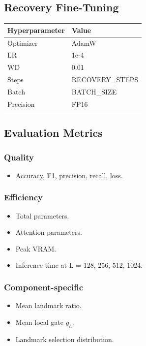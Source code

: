 \subsection{Recovery Fine-Tuning}

\begin{table}[H]
\centering
\small
\begin{tabular}{ll}
\toprule
\textbf{Hyperparameter} & \textbf{Value} \\
\midrule
Optimizer & AdamW \\
LR & 1e-4 \\
WD & 0.01 \\
Steps & {{RECOVERY\_STEPS}} \\
Batch & {{BATCH\_SIZE}} \\
Precision & FP16 \\
\bottomrule
\end{tabular}
\end{table}

\subsection{Evaluation Metrics}

\subsubsection{Quality}
\begin{itemize}
\item Accuracy, F1, precision, recall, loss.

\end{itemize}
\subsubsection{Efficiency}
\begin{itemize}
\item Total parameters.
\item Attention parameters.
\item Peak VRAM.
\item Inference time at L = 128, 256, 512, 1024.

\end{itemize}
\subsubsection{Component-specific}
\begin{itemize}
\item Mean landmark ratio.
\item Mean local gate $g_h$.
\item Landmark selection distribution.

\end{itemize}
